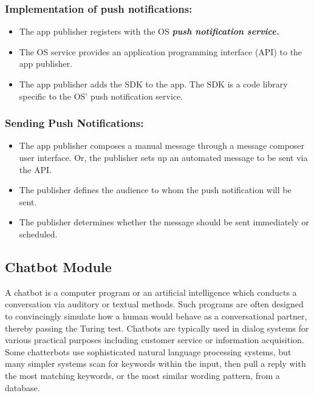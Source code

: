 \subsubsection{Implementation of push notifications:}
\begin{itemize}

\item{The app publisher registers with the OS \em\bf{ push notification service.}}

\item{The OS service provides an application programming interface (API) to the app publisher.}

\item{The app publisher adds the SDK to the app. The SDK is a code library specific to the OS' push notification service.}

\end{itemize}

\subsubsection{Sending Push Notifications:}
\begin{itemize}

\item{The app publisher composes a manual message through a message composer user interface. Or, the publisher sets up an automated message to be sent via the API.}

\item{The publisher defines the audience to whom the push notification will be sent.}

\item{The publisher determines whether the message should be sent immediately or scheduled.}

\end{itemize}


\subsection{Chatbot Module}

A chatbot is a computer program or an artificial intelligence which conducts a conversation via auditory or textual methods. Such programs are often designed to convincingly simulate how a human would behave as a conversational partner, thereby passing the Turing test. Chatbots are typically used in dialog systems for various practical purposes including customer service or information acquisition. Some chatterbots use sophisticated natural language processing systems, but many simpler systems scan for keywords within the input, then pull a reply with the most matching keywords, or the most similar wording pattern, from a database.

